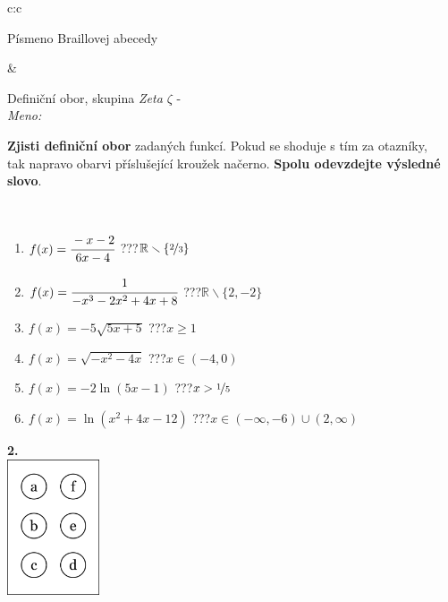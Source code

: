 \documentclass[10pt]{report}
\begin{document}
\begin{tabular}{c:c}
\begin{minipage}[c][104.5mm][t]{0.5\linewidth}
\begin{center}
\begin{minipage}{0.20\linewidth}
\begin{center}
{\small Písmeno Braillovej abecedy}
\end{center}
\end{minipage}
\end{center}
\end{minipage}
&
\begin{minipage}[c][104.5mm][t]{0.5\linewidth}
\begin{center}
\vspace{7mm}
{\huge Definiční obor, skupina \textit{Zeta $\zeta$} -}\\[5mm]
\textit{Meno:}\phantom{xxxxxxxxxxxxxxxxxxxxxxxxxxxxxxxxxxxxxxxxxxxxxxxxxxxxxxxxxxxxxxxxx}\\[5mm]
\begin{minipage}{0.95\linewidth}
\textbf{Zjisti definiční obor} zadaných funkcí. Pokud se shoduje s tím za otazníky,\\tak napravo obarvi příslušející kroužek načerno. \textbf{Spolu odevzdejte výsledné slovo}.
\end{minipage}
\\[1mm]
\begin{minipage}{0.79\linewidth}
\begin{center}
\begin{varwidth}{\linewidth}
\begin{enumerate}
\normalsizerrr
\item $f(x)=\cfrac{-x-2}{6x-4}$\quad \dotfill\; ???\;\dotfill \quad $\mathbb{R}\smallsetminus\{\nicefrac{2}{3}\}$
\item $f(x)=\cfrac{1}{-x^3-2x^2+4x+8}$\quad \dotfill\; ???\;\dotfill \quad $\mathbb{R}\smallsetminus\{2,-2\}$
\item $f(x)=-5\sqrt{5x+5}$\quad \dotfill\; ???\;\dotfill \quad $x\geq1$
\item $f(x)=\sqrt{-x^2-4x}$\quad \dotfill\; ???\;\dotfill \quad $x\in(-4 , 0)$
\item $f(x)=-2\ln{(5x-1)}$\quad \dotfill\; ???\;\dotfill \quad $x>\nicefrac{1}{5}$
\item $f(x)=\ln{(x^2+4x-12)}$\quad \dotfill\; ???\;\dotfill \quad $x\in(-\infty , -6)\cup(2 , \infty)$
\end{enumerate}
\end{varwidth}
\end{center}
\end{minipage}
\begin{minipage}{0.20\linewidth}
\begin{center}
{\Huge\bfseries 2.} \\[2mm]
\includegraphics[height=40mm]{../images/braille.png}

\end{center}
\end{minipage}
\end{center}
\end{minipage}
\end{tabular}
\end{document}
